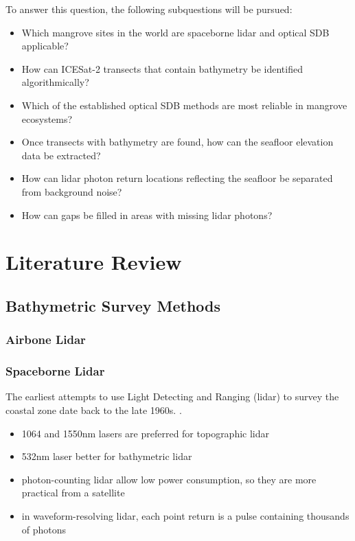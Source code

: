 To answer this question, the following subquestions will be pursued:

\begin{itemize}
      \item Which mangrove sites in the world are spaceborne lidar and optical SDB applicable?
      \item How can ICESat-2 transects that contain bathymetry be identified algorithmically?
      \item Which of the established optical SDB methods are most reliable in mangrove ecosystems?
      \item Once transects with bathymetry are found, how can the seafloor elevation data be extracted?
      \item How can lidar photon return locations reflecting the seafloor be separated from background noise?
      \item How can gaps be filled in areas with missing lidar photons?
\end{itemize}

\chapter{Literature Review}


\section{Bathymetric Survey Methods}

\subsection[]{Airbone Lidar}
\subsection{Spaceborne Lidar}

The earliest attempts to use Light Detecting and Ranging (lidar) to survey the coastal zone date back to the late 1960s. \cite{Bailly2016}.

\begin{itemize}
      \item 1064 and 1550nm lasers are preferred for topographic lidar
      \item 532nm laser better for bathymetric lidar
      \item photon-counting lidar allow low power consumption, so they are more practical from a satellite
      \item in waveform-resolving lidar, each point return is a pulse containing thousands of photons
\end{itemize}

